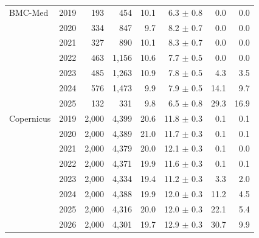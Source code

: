 \begin{tabular}{llrrrrrr}
\midrule
BMC-Med & 2019 & 193 & 454 & 10.1 & 6.3 $\pm$ 0.8 & 0.0 & 0.0 \\
 & 2020 & 334 & 847 & 9.7 & 8.2 $\pm$ 0.7 & 0.0 & 0.0 \\
 & 2021 & 327 & 890 & 10.1 & 8.3 $\pm$ 0.7 & 0.0 & 0.0 \\
 & 2022 & 463 & 1,156 & 10.6 & 7.7 $\pm$ 0.5 & 0.0 & 0.0 \\
 & 2023 & 485 & 1,263 & 10.9 & 7.8 $\pm$ 0.5 & 4.3 & 3.5 \\
 & 2024 & 576 & 1,473 & 9.9 & 7.9 $\pm$ 0.5 & 14.1 & 9.7 \\
 & 2025 & 132 & 331 & 9.8 & 6.5 $\pm$ 0.8 & 29.3 & 16.9 \\
\midrule
Copernicus & 2019 & 2,000 & 4,399 & 20.6 & 11.8 $\pm$ 0.3 & 0.1 & 0.1 \\
 & 2020 & 2,000 & 4,389 & 21.0 & 11.7 $\pm$ 0.3 & 0.1 & 0.1 \\
 & 2021 & 2,000 & 4,379 & 20.0 & 12.1 $\pm$ 0.3 & 0.1 & 0.0 \\
 & 2022 & 2,000 & 4,371 & 19.9 & 11.6 $\pm$ 0.3 & 0.1 & 0.1 \\
 & 2023 & 2,000 & 4,334 & 19.4 & 11.2 $\pm$ 0.3 & 3.3 & 2.0 \\
 & 2024 & 2,000 & 4,388 & 19.9 & 12.0 $\pm$ 0.3 & 11.2 & 4.5 \\
 & 2025 & 2,000 & 4,316 & 20.0 & 12.0 $\pm$ 0.3 & 22.1 & 5.4 \\
 & 2026 & 2,000 & 4,301 & 19.7 & 12.9 $\pm$ 0.3 & 30.7 & 9.9 \\
\bottomrule
\end{tabular}
